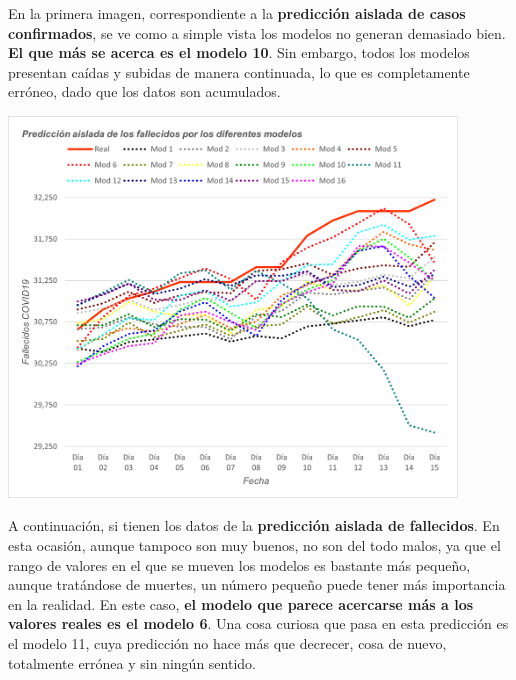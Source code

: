 \documentclass[12pt,a4paper, xcolor=table]{article}
\begin{document}
            En la primera imagen, correspondiente a la \textbf{predicción aislada de casos confirmados}, se ve como a simple vista los modelos no generan demasiado bien. \textbf{El que más se acerca es el modelo 10}. Sin embargo, todos los modelos presentan caídas y subidas de manera continuada, lo que es completamente erróneo, dado que los datos son acumulados.

            \begin{center}
                \centering
                \includegraphics[width=450px]{img/pred_a_fall_ES.png}
            \end{center}

            A continuación, si tienen los datos de la \textbf{predicción aislada de fallecidos}. En esta ocasión, aunque tampoco son muy buenos, no son del todo malos, ya que el rango de valores en el que se mueven los modelos es bastante más pequeño, aunque tratándose de muertes, un número pequeño puede tener más importancia en la realidad. En este caso, \textbf{el modelo que parece acercarse más a los valores reales es el modelo 6}. Una cosa curiosa que pasa en esta predicción es el modelo 11, cuya predicción no hace más que decrecer, cosa de nuevo, totalmente errónea y sin ningún sentido.
\end{document}
